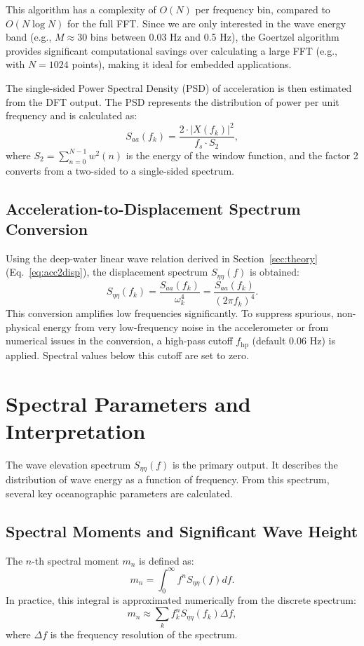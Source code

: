 \documentclass[11pt,letterpaper]{article}
\begin{document}
    This algorithm has a complexity of $O(N)$ per frequency bin, compared to $O(N \log N)$ for the full FFT. Since we are only interested in the wave energy band (e.g., $M \approx 30$ bins between 0.03 Hz and 0.5 Hz), the Goertzel algorithm provides significant computational savings over calculating a large FFT (e.g., with $N=1024$ points), making it ideal for embedded applications.

    The single-sided Power Spectral Density (PSD) of acceleration is then estimated from the DFT output. The PSD represents the distribution of power per unit frequency and is calculated as:
    \begin{equation}
        S_{aa}(f_k) = \frac{2 \cdot |X(f_k)|^2}{f_s \cdot S_2},
    \end{equation}
    where $S_2 = \sum_{n=0}^{N-1} w^2(n)$ is the energy of the window function, and the factor 2 converts from a two-sided to a single-sided spectrum.

    \subsection{Acceleration-to-Displacement Spectrum Conversion}
    Using the deep-water linear wave relation derived in Section~\ref{sec:theory} (Eq.~\ref{eq:acc2disp}), the displacement spectrum $S_{\eta\eta}(f)$ is obtained:
    \begin{equation}
        S_{\eta\eta}(f_k) = \frac{S_{aa}(f_k)}{\omega_k^4} = \frac{S_{aa}(f_k)}{(2\pi f_k)^4}.
    \end{equation}
    This conversion amplifies low frequencies significantly. To suppress spurious, non-physical energy from very low-frequency noise in the accelerometer or from numerical issues in the conversion, a high-pass cutoff $f_\text{hp}$ (default $0.06$ Hz) is applied. Spectral values below this cutoff are set to zero.

    \section{Spectral Parameters and Interpretation}
    \label{sec:params}
    The wave elevation spectrum $S_{\eta\eta}(f)$ is the primary output. It describes the distribution of wave energy as a function of frequency. From this spectrum, several key oceanographic parameters are calculated.

    \subsection{Spectral Moments and Significant Wave Height}
    The $n$-th spectral moment $m_n$ is defined as:
    \begin{equation}
        m_n = \int_{0}^{\infty} f^n S_{\eta\eta}(f)  df.
    \end{equation}
    In practice, this integral is approximated numerically from the discrete spectrum:
    \begin{equation}
        m_n \approx \sum_{k} f_k^n S_{\eta\eta}(f_k) \Delta f,
    \end{equation}
    where $\Delta f$ is the frequency resolution of the spectrum.
\end{document}
